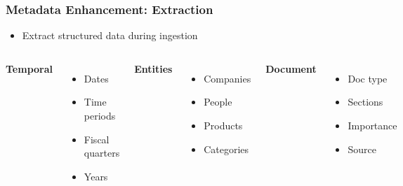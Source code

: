 \begin{frame}
    \frametitle{Metadata Enhancement: Extraction}
    \begin{itemize}
        \item Extract structured data during ingestion
    \end{itemize}
    
    \begin{columns}
        \textbf{Temporal}
        \begin{itemize}
            \item Dates
            \item Time periods
            \item Fiscal quarters
            \item Years
        \end{itemize}
        
        \textbf{Entities}
        \begin{itemize}
            \item Companies
            \item People
            \item Products
            \item Categories
        \end{itemize}
        
        \textbf{Document}
        \begin{itemize}
            \item Doc type
            \item Sections
            \item Importance
            \item Source
        \end{itemize}
    \end{columns}
    
    \vspace{0.3cm}
    \begin{center}
    \end{center}
\end{frame}

